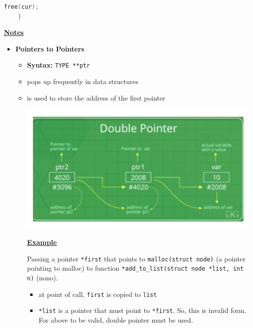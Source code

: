 \documentclass[12pt]{article}
\begin{document}
\begin{enumerate}[1.]
\begin{lstlisting}[language=c]
        free(cur);
    }
\end{lstlisting}

    \bigskip

    \underline{\textbf{Notes}}

    \begin{itemize}
        \item \textbf{Pointers to Pointers}

        \begin{itemize}
            \item \textbf{Syntax:} \texttt{TYPE **ptr}
            \item pops up frequently in data structures
            \item is used to store the address of the first pointer

            \begin{center}
            \includegraphics[width=\linewidth]{images/review_8_solution_8.png}
            \end{center}

            \bigskip

            \underline{\textbf{Example}}

            \bigskip

            Passing a pointer \texttt{*first} that points to \texttt{malloc(struct node)} (a pointer pointing to malloc)
            to function \texttt{*add\_to\_list(struct node *list, int n)} (nono).

            \bigskip

            \begin{itemize}
                \item at point of call, \texttt{first} is copied to \texttt{list}
                \item \texttt{*list} is a pointer that must point to \texttt{*first}. So, this is invalid form.
                For above to be valid, double pointer must be used.


\end{itemize}
\end{itemize}
\end{itemize}
\end{enumerate}
\end{document}

